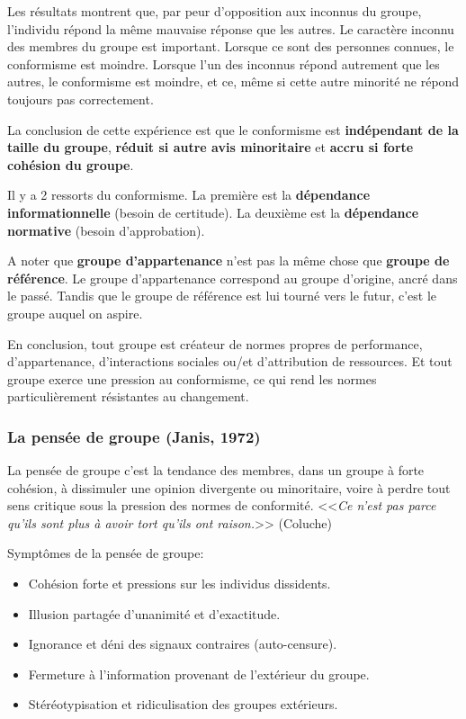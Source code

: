 \documentclass[12pt]{article}
\begin{document}
	Les résultats montrent que, par peur d'opposition aux inconnus du groupe, l'individu répond la même mauvaise réponse que les autres. Le caractère inconnu des membres du groupe est important. Lorsque ce sont des personnes connues, le conformisme est moindre. Lorsque l'un des inconnus répond autrement que les autres, le conformisme est moindre, et ce, même si cette autre minorité ne répond toujours pas correctement. \newline
	
	La conclusion de cette expérience est que le conformisme est \textbf{indépendant de la taille du groupe}, \textbf{réduit si autre avis minoritaire} et \textbf{accru si forte cohésion du groupe}. \newline
	
	Il y a 2 ressorts du conformisme. La première est la \textbf{dépendance informationnelle} (besoin de certitude). La deuxième est la \textbf{dépendance normative} (besoin d'approbation). \newline
	
	A noter que \textbf{groupe d'appartenance} n'est pas la même chose que  \textbf{groupe de référence}. Le groupe d'appartenance correspond au groupe d'origine, ancré dans le passé. Tandis que le groupe de référence est lui tourné vers le futur, c'est le groupe auquel on aspire. \newline
	
	En conclusion, tout groupe est créateur de normes propres de performance, d'appartenance, d'interactions sociales ou/et d'attribution de ressources. Et tout groupe exerce une pression au conformisme, ce qui rend  les normes particulièrement résistantes au changement. 
		 		
		\subsubsection{La pensée de groupe (Janis, 1972)}
		
		La pensée de groupe c'est la tendance des membres, dans un groupe à forte cohésion, à dissimuler une opinion divergente ou minoritaire, voire à perdre tout sens critique sous la pression des normes de conformité.  \newline
		<<\textit{Ce n'est pas parce qu'ils sont plus à avoir tort qu'ils ont raison.}>> (Coluche) \newline
		
		Symptômes de la pensée de groupe:
		\begin{itemize}
		\item Cohésion forte et pressions sur les individus dissidents.
		\item Illusion partagée d'unanimité et d'exactitude.
		\item Ignorance et déni des signaux contraires (auto-censure).
		\item Fermeture à l'information provenant de l'extérieur du groupe.
		\item Stéréotypisation et ridiculisation des groupes extérieurs. \newline
		\end{itemize}
		
\end{document}
